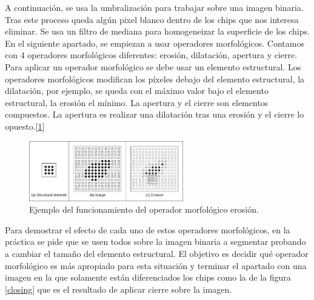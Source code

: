\documentclass[a4paper,12pt]{report}
\begin{document}
A continuación, se usa la umbralización para trabajar sobre una imagen binaria. Tras este proceso queda algún pixel blanco dentro de los chips que nos interesa eliminar. Se usa un filtro de mediana para homogeneizar la superficie de los chips.\\

En el siguiente apartado, se empiezan a usar operadores morfológicos. Contamos con 4 operadores morfológicos diferentes: erosión, dilatación, apertura y cierre. Para aplicar un operador morfológico se debe usar un elemento estructural. Los operadores morfológicos modifican los píxeles debajo del elemento estructural, la dilatación, por ejemplo, se queda con el máximo valor bajo el elemento estructural, la erosión el mínimo. La apertura y el cierre son elementos compuestos. La apertura es realizar una dilatación tras una erosión y el cierre lo opuesto.[\ref{erosion}]\\

\begin{figure}[h]
\centering
\includegraphics[width=0.6\textwidth]{imagenes/erosion}
\caption{Ejemplo del funcionamiento del operador morfológico erosión.}
\label{erosion}
\end{figure}

Para demostrar el efecto de cada uno de estos operadores morfológicos, en la práctica se pide que se usen todos sobre la imagen binaria a segmentar probando a cambiar el tamaño del elemento estructural. El objetivo es decidir qué operador morfológico es más apropiado para esta situación y terminar el apartado con una imagen en la que solamente están diferenciados los chips como la de la figura \ref{closing} que es el resultado de aplicar cierre sobre la imagen.\\
\end{document}
